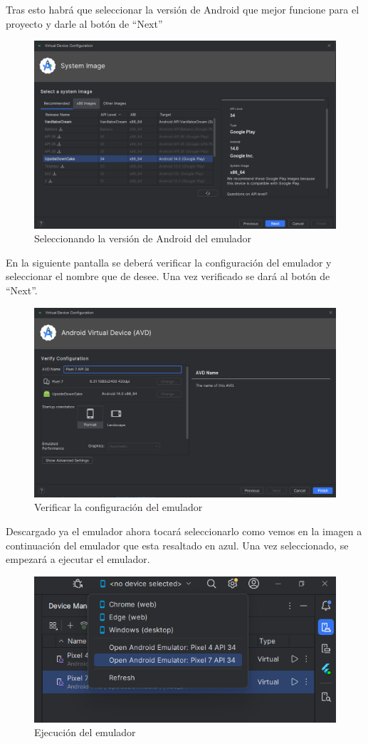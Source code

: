 Tras esto habrá que seleccionar la versión de Android que mejor funcione para el proyecto y darle al botón de ``Next''

\begin{figure}[H]
    \centering
    \includegraphics[width=0.8\linewidth]{InstalacionyEjecucion3.png}
    \caption{Seleccionando la versión de Android del emulador}
    \label{C14}
\end{figure}

En la siguiente pantalla se deberá verificar la configuración del emulador y seleccionar el nombre que de desee. Una vez verificado se dará al botón de ``Next''.

\begin{figure}[H]
    \centering
    \includegraphics[width=0.8\linewidth]{InstalacionyEjecucion4.png}
    \caption{Verificar la configuración del emulador}
    \label{C15}
\end{figure}

Descargado ya el emulador ahora tocará seleccionarlo como vemos en la imagen a continuación del emulador que esta resaltado en azul. Una vez seleccionado, se empezará a ejecutar el emulador.

\begin{figure}[H]
    \centering
    \includegraphics[width=0.8\linewidth]{InstalacionyEjecucion5.png}
    \caption{Ejecución del emulador}
    \label{C16}
\end{figure}

